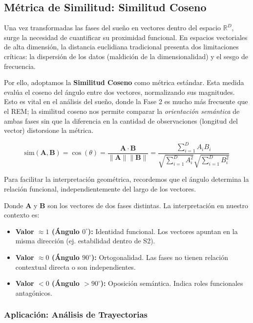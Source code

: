 \subsection{Métrica de Similitud: Similitud Coseno}

Una vez transformadas las fases del sueño en vectores dentro del espacio $\mathbb{R}^D$, surge la necesidad de cuantificar su proximidad funcional. En espacios vectoriales de alta dimensión, la distancia euclidiana tradicional presenta dos limitaciones críticas: la dispersión de los datos (maldición de la dimensionalidad) y el sesgo de frecuencia.

Por ello, adoptamos la \textbf{Similitud Coseno} como métrica estándar. Esta medida evalúa el coseno del ángulo entre dos vectores, normalizando sus magnitudes. Esto es vital en el análisis del sueño, donde la Fase 2 es mucho más frecuente que el REM; la similitud coseno nos permite comparar la \textit{orientación semántica} de ambas fases sin que la diferencia en la cantidad de observaciones (longitud del vector) distorsione la métrica.

\begin{equation}
    \text{sim}(\mathbf{A}, \mathbf{B}) = \cos(\theta) = \frac{\mathbf{A} \cdot \mathbf{B}}{\|\mathbf{A}\| \|\mathbf{B}\|} = \frac{\sum_{i=1}^{D} A_i B_i}{\sqrt{\sum_{i=1}^{D} A_i^2} \sqrt{\sum_{i=1}^{D} B_i^2}}
\end{equation}

Para facilitar la interpretación geométrica, recordemos que el ángulo determina la relación funcional, independientemente del largo de los vectores.

Donde $\mathbf{A}$ y $\mathbf{B}$ son los vectores de dos fases distintas. La interpretación en nuestro contexto es:
\begin{itemize}
    \item \textbf{Valor $\approx 1$ (Ángulo $0^\circ$):} Identidad funcional. Los vectores apuntan en la misma dirección (ej. estabilidad dentro de S2).
    \item \textbf{Valor $\approx 0$ (Ángulo $90^\circ$):} Ortogonalidad. Las fases no tienen relación contextual directa o son independientes.
    \item \textbf{Valor $< 0$ (Ángulo $>90^\circ$):} Oposición semántica. Indica roles funcionales antagónicos.
\end{itemize}

\subsubsection{Aplicación: Análisis de Trayectorias}

